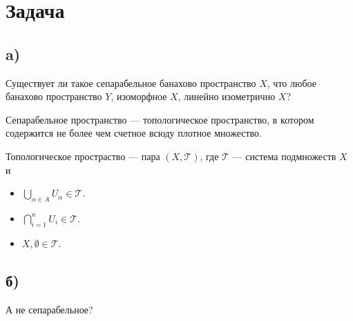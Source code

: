 \section{Задача}

\subsection*{a)}
Существует ли такое сепарабельное банахово пространство $X$, что любое банахово пространство $Y$, изоморфное $X$, линейно изометрично $X$?

{ Сепарабельное пространство} --- топологическое пространство, в котором содержится не более чем счетное всюду плотное множество.

{ Топологическое простраство} --- пара $(X, \mathcal T)$, где $\mathcal T$ --- система подмножеств $X$ и
\begin{itemize}
    \item $\bigcup_{\alpha \in A}{U_{\alpha} \in \mathcal T}$.
    \item $\bigcap_{i = 1}^{n}{U_i \in \mathcal T}$.
    \item $X, \emptyset \in \mathcal T$.
\end{itemize}

\subsection*{б)} 
А не сепарабельное?
